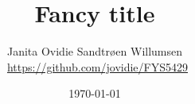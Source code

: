 \documentclass[reprint,english,notitlepage,nofootinbib]{revtex4-1}  %
\begin{document}
% 


% 
\title{Fancy title}
\author{Janita Ovidie Sandtrøen Willumsen \\ \faGithub \, \url{https://github.com/jovidie/FYS5429}}        
\date{\today}
\noaffiliation


\maketitle

% 
% 
% 
% 
% 
% 
% 
% 
% 

 
\newpage 


% 

\end{document}
